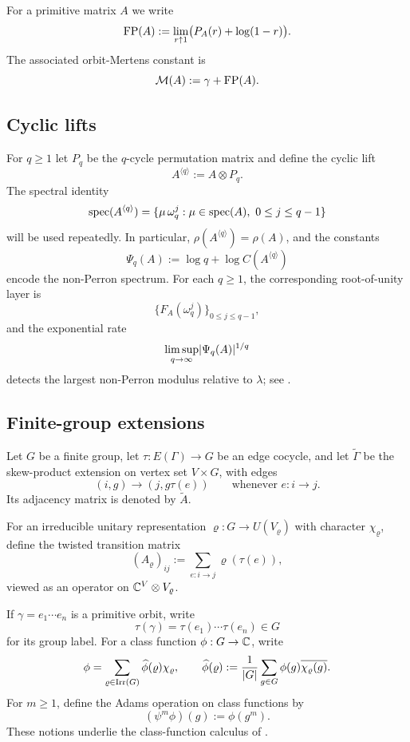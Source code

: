 \begin{definition}\label{def:abel-finite-part}
For a primitive matrix \(A\) we write
\[
  \operatorname{FP}(A):=\lim_{r\uparrow 1}\bigl(P_A(r)+\log(1-r)\bigr).
\]
The associated orbit-Mertens constant is
\[
  \mathcal M(A):=\gamma+\operatorname{FP}(A).
\]
\end{definition}

\subsection{Cyclic lifts}

For \(q\ge 1\) let \(P_q\) be the \(q\)-cycle permutation matrix and
define the cyclic lift
\begin{equation}\label{eq:cyclic-lift-def}
  A^{\langle q\rangle}:=A\otimes P_q.
\end{equation}
The spectral identity
\[
  \operatorname{spec}(A^{\langle q\rangle})
  =\{\mu\,\omega_q^j:\mu\in\operatorname{spec}(A),\ 0\le j\le q-1\}
\]
will be used repeatedly. In particular,
\(\rho(A^{\langle q\rangle})=\rho(A)\), and the constants
\[
  \Psi_q(A):=\log q+\log C(A^{\langle q\rangle})
\]
encode the non-Perron spectrum. For each \(q\ge 1\), the corresponding
root-of-unity layer is
\[
  \{F_A(\omega_q^j)\}_{0\le j\le q-1},
\]
and the exponential rate
\[
  \limsup_{q\to\infty}\lvert \Psi_q(A) \rvert^{1/q}
\]
detects the largest non-Perron modulus relative to \(\lambda\); see
.

\subsection{Finite-group extensions}

Let \(G\) be a finite group, let \(\tau:E(\Gamma)\to G\) be an edge
cocycle, and let \(\widetilde\Gamma\) be the skew-product extension on
vertex set \(V\times G\), with edges
\[
  (i,g)\longrightarrow (j,g\tau(e))
  \qquad \text{whenever } e:i\to j.
\]
Its adjacency matrix is denoted by \(\widetilde A\).

For an irreducible unitary representation
\(\varrho:G\to U(V_\varrho)\) with character \(\chi_\varrho\), define
the twisted transition matrix
\begin{equation}\label{eq:twisted-matrix-def}
  (A_\varrho)_{ij}:=\sum_{e:i\to j}\varrho(\tau(e)),
\end{equation}
viewed as an operator on \(\mathbb{C}^V\otimes V_\varrho\).

If \(\gamma=e_1\cdots e_n\) is a primitive orbit, write
\[
  \tau(\gamma)=\tau(e_1)\cdots\tau(e_n)\in G
\]
for its group label. For a class function \(\phi:G\to\mathbb{C}\), write
\begin{equation}\label{eq:class-function-fourier}
  \phi
  =\sum_{\varrho\in\operatorname{Irr}(G)}\widehat\phi(\varrho)\chi_\varrho,
  \qquad
  \widehat\phi(\varrho)
  :=\frac{1}{|G|}\sum_{g\in G}\phi(g)\overline{\chi_\varrho(g)}.
\end{equation}
For \(m\ge 1\), define the Adams operation on class functions by
\begin{equation}\label{eq:adams-class-function}
  (\psi^m\phi)(g):=\phi(g^m).
\end{equation}
These notions underlie the class-function calculus of
.

